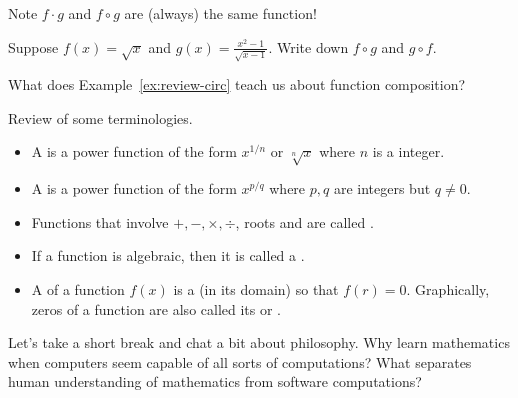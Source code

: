 \documentclass[../main.tex]{subfiles}
\begin{document}

\faExclamationTriangle{}
Note \(f \cdot g\) and \(f \circ g\) are \underline{} (always) the same function!


\begin{example} \label{ex:review-circ}
  Suppose \(f(x) = \sqrt{x}\) and \(g(x) = \frac{x^{2}-1}{\sqrt{x-1}}\). Write down \(f \circ g\) and \(g \circ f\).


  \faComments{} What does Example~\ref{ex:review-circ} teach us about function composition?

\end{example}
\clearpage

Review of some terminologies. 
\begin{itemize}[wide, noitemsep]
  \item A  is a power function of the form \(x^{1/n}\) or \(\sqrt[n]{x}\) where \(n\) is a  integer. 


  \item A  is a power function of the form \(x^{p/q}\) where \(p,q\) are integers but \(q \ne 0\).


  \item Functions that involve \(+, -, \times, \div\), roots and  are called . 


  \item If a function is  algebraic, then it is called a .


  \item A  of a function \(f(x)\) is a  (in its domain) so that \(f(r) = 0\).  Graphically, zeros of a function are also called its  or \hlmain{\underline{\hspace{1in}}}.

\end{itemize}

Let's take a short break and chat a bit about philosophy. \faComments{} Why learn mathematics when computers seem capable of all sorts of computations? \faComments{} What separates human understanding of mathematics from software computations?
\end{document}
